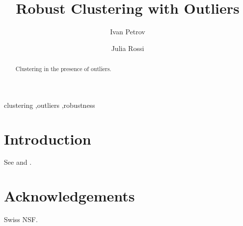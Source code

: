 \documentclass[preprint,12pt]{elsarticle}
\begin{document}
\begin{frontmatter}

\title{Robust Clustering with Outliers}

\author[inst1]{Ivan Petrov}
\author[inst1,inst2]{Julia Rossi}


\begin{abstract}
Clustering in the presence of outliers.
\end{abstract}

\begin{keyword}
clustering \sep outliers \sep robustness
\end{keyword}

\end{frontmatter}

\section{Introduction}
See \citet{knuth} and \citep{lamport}.

\section*{Acknowledgements}
Swiss NSF.



\end{document}
